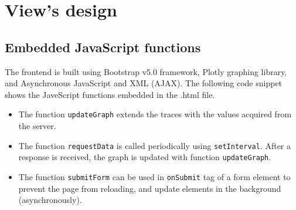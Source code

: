 \documentclass[../main.tex]{subfiles}
\begin{document}
    \pagebreak
    \section{View's design} \label{sec:application_flowchart}
    \subsection{Embedded JavaScript functions}
    \justify
    The frontend is built using Bootstrap v5.0 framework, Plotly graphing library, and Asynchronous JavaScript and XML (AJAX). The following code snippet shows the JaveScript functions embedded in the .html file.

    

    \justify
    \begin{itemize}
        \item The function \lstinline[language=JavaScript]{updateGraph} extends the traces with the values acquired from the server.
        \item The function \lstinline[language=JavaScript]{requestData} is called periodically using \lstinline[language=JavaScript]{setInterval}. After a response is received, the graph is updated with function \lstinline[language=JavaScript]{updateGraph}.
        \item The function \lstinline[language=JavaScript]{submitForm} can be used in \lstinline[language=HTML]{onSubmit} tag of a form element to prevent the page from reloading, and update elements in the background (asynchronously).
    \end{itemize}
    
    \pagebreak
\end{document}
